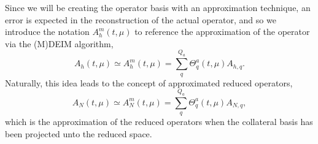 \documentclass[../../thesis.tex]{subfiles}
\begin{document}
Since we will be creating the operator basis with an approximation technique, 
an error is expected in the reconstruction of the actual operator, 
and so we introduce the notation $A_h^m(t, \mu)$ to reference the approximation of the operator via the (M)DEIM algorithm,
\begin{equation}
    \label{eq:1d_rom_burgers_system_approximation}
    A_h(t, \mu) \simeq A_h^m(t, \mu) = \sum_q^{Q_a} \Theta_q^a(t, \mu) A_{h,q}.
\end{equation}
Naturally, this idea leads to the concept of approximated reduced operators,
\begin{equation}
    A_N(t, \mu) \simeq A_N^m(t, \mu) = \sum_q^{Q_a} \Theta_q^a(t, \mu) A_{N,q},
\end{equation}
which is the approximation of the reduced operators when the collateral basis 
has been projected unto the reduced space.

\end{document}
